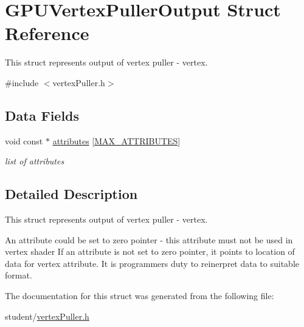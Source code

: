 \hypertarget{structGPUVertexPullerOutput}{\section{G\-P\-U\-Vertex\-Puller\-Output Struct Reference}
\label{structGPUVertexPullerOutput}
}


This struct represents output of vertex puller -\/ vertex.  




{\ttfamily \#include $<$vertex\-Puller.\-h$>$}

\subsection*{Data Fields}
\begin{DoxyCompactItemize}
\item 
\hypertarget{structGPUVertexPullerOutput_aea734793f0b20b263d90d9abaf582fe5}{void const $\ast$ \hyperlink{structGPUVertexPullerOutput_aea734793f0b20b263d90d9abaf582fe5}{attributes} \mbox{[}\hyperlink{fwd_8h_a4d992a1f9192388588184753115f6c03}{M\-A\-X\-\_\-\-A\-T\-T\-R\-I\-B\-U\-T\-E\-S}\mbox{]}}\label{structGPUVertexPullerOutput_aea734793f0b20b263d90d9abaf582fe5}

\begin{DoxyCompactList}\small\item\em list of attributes \end{DoxyCompactList}\end{DoxyCompactItemize}


\subsection{Detailed Description}
This struct represents output of vertex puller -\/ vertex. 

An attribute could be set to zero pointer -\/ this attribute must not be used in vertex shader If an attribute is not set to zero pointer, it points to location of data for vertex attribute. It is programmers duty to reinerpret data to suitable format. 

The documentation for this struct was generated from the following file\-:\begin{DoxyCompactItemize}
\item 
student/\hyperlink{vertexPuller_8h}{vertex\-Puller.\-h}\end{DoxyCompactItemize}
